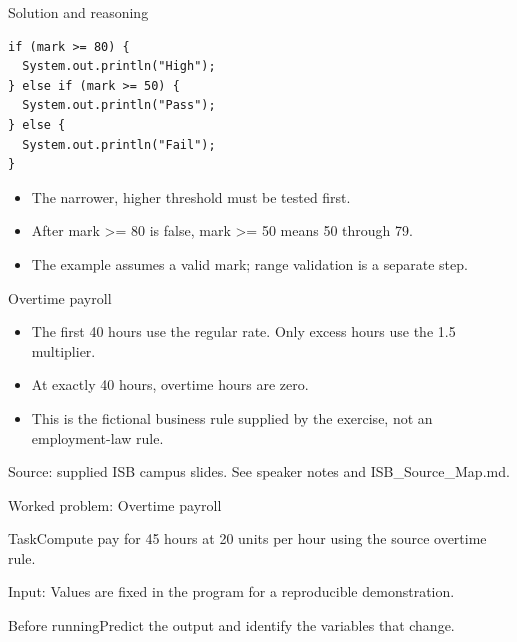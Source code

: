\documentclass[10pt,aspectratio=169]{beamer}
\begin{document}
\begin{frame}[fragile,t]{Solution and reasoning}
\begin{lstlisting}
if (mark >= 80) {
  System.out.println("High");
} else if (mark >= 50) {
  System.out.println("Pass");
} else {
  System.out.println("Fail");
}
\end{lstlisting}\vspace{1mm}\small\begin{itemize}
\item The narrower, higher threshold must be tested first.
\item After mark \textgreater{}= 80 is false, mark \textgreater{}= 50 means 50 through 79.
\item The example assumes a valid mark; range validation is a separate step.
\end{itemize}
\end{frame}

\begin{frame}[fragile,t]{Overtime payroll}
\begin{itemize}
\item The first 40 hours use the regular rate. Only excess hours use the 1.5 multiplier.
\item At exactly 40 hours, overtime hours are zero.
\item This is the fictional business rule supplied by the exercise, not an employment{-}law rule.
\end{itemize}
\vspace{3mm}\footnotesize\textcolor{accent}{Source: supplied ISB campus slides. See speaker notes and ISB\_Source\_Map.md.}
\end{frame}

\begin{frame}[fragile,t]{Worked problem: Overtime payroll}
\begin{block}{Task}Compute pay for 45 hours at 20 units per hour using the source overtime rule.\end{block}
\small Input: Values are fixed in the program for a reproducible demonstration.\par\vspace{3mm}\begin{exampleblock}{Before running}Predict the output and identify the variables that change.\end{exampleblock}
\end{frame}
\end{document}

